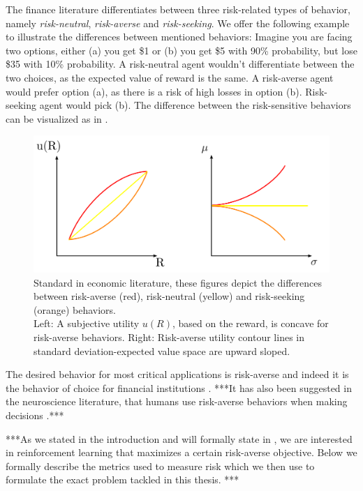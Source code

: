 The finance literature differentiates between three risk-related types of behavior, namely \textit{risk-neutral}, \textit{risk-averse} and \textit{risk-seeking}. We offer the following example to illustrate the differences between mentioned behaviors: Imagine you are facing two options, either (a) you get \$1 or (b) you get \$5 with 90\% probability, but lose \$35 with 10\% probability. A risk-neutral agent wouldn't differentiate between the two choices, as the expected value of reward is the same. A risk-averse agent would prefer option (a), as there is a risk of high losses in option (b). Risk-seeking agent would pick (b). The difference between the risk-sensitive behaviors can be visualized as in .

\begin{figure}
\center
\includegraphics[width=0.8\linewidth]{gfx/risk.pdf}
\caption{Standard in economic literature, these figures depict the differences between risk-averse (red), risk-neutral (yellow) and risk-seeking (orange) behaviors.
\\
Left: A subjective utility $u(R)$, based on the reward, is concave for risk-averse behaviors. 
Right: Risk-averse utility contour lines in standard deviation-expected value space are upward sloped.
}
\label{fig:risk}
\end{figure}

The desired behavior for most critical applications is risk-averse and indeed it is the behavior of choice for financial institutions \citep{wipplinger2007philippe, basel2013fundamental}. ***It has also been suggested in the neuroscience literature, that humans use risk-averse behaviors when making decisions \citep{shen2014risk}.***

***As we stated in the introduction and will formally state in , we are interested in reinforcement learning that maximizes a certain risk-averse objective. Below we formally describe the metrics used to measure risk which we then use to formulate the exact problem tackled in this thesis. ***


